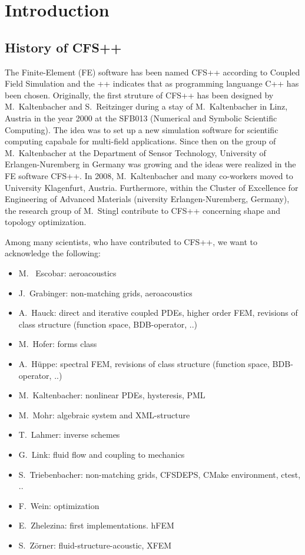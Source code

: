 \chapter{Introduction}

\section{History of CFS++}

The Finite-Element (FE) software has  been named {\sf CFS++} according to {\sf
C}oupled  {\sf F}ield  {\sf S}imulation  and the  {\sf ++}  indicates  that as
programming languange C++  has been chosen. Originally, the  first struture of
CFS++ has been designed by  M.~Kaltenbacher and S.~Reitzinger during a stay of
M.~Kaltenbacher in Linz, Austria in the year 2000 at the SFB013 (Numerical and
Symbolic  Scientific Computing).  The  idea was  to  set up  a new  simulation
software for scientific computing capabale for multi-field applications. Since
then on the  group of M.~Kaltenbacher at the  Department of Sensor Technology,
University of  Erlangen-Nuremberg in  Germany was growing  and the  ideas were
realized  in  the  FE  software  CFS++.  In  2008,  M.~Kaltenbacher  and  many
co-workers moved  to University Klagenfurt, Austria.   Furthermore, within the
Cluster  of  Excellence  for  Engineering  of  Advanced  Materials  (niversity
Erlangen-Nuremberg, Germany),  the research  group of M.~Stingl  contribute to
CFS++ concerning shape and topology optimization.

Among many scientists,  who have contributed to CFS++,  we want to acknowledge
the following:

\begin{itemize}
\item M.~ Escobar: aeroacoustics
\item J.~Grabinger: non-matching grids, aeroacoustics
\item A.~Hauck: direct and iterative coupled PDEs, higher order FEM, revisions of class
  structure (function space, BDB-operator, ..) 
\item M.~Hofer: forms class
\item A.~H\"uppe: spectral FEM, revisions of class structure (function
  space, BDB-operator, ..)
\item M.~Kaltenbacher: nonlinear PDEs, hysteresis, PML
\item M.~Mohr: algebraic system and XML-structure
\item T.~Lahmer: inverse schemes
\item G.~Link: fluid flow and coupling to mechanics
\item S.~Triebenbacher: non-matching grids, CFSDEPS, CMake
  environment, ctest, ..
\item F.~Wein: optimization
\item E.~Zhelezina: first implementations. hFEM
\item S.~Z\"orner: fluid-structure-acoustic, XFEM
\end{itemize}


